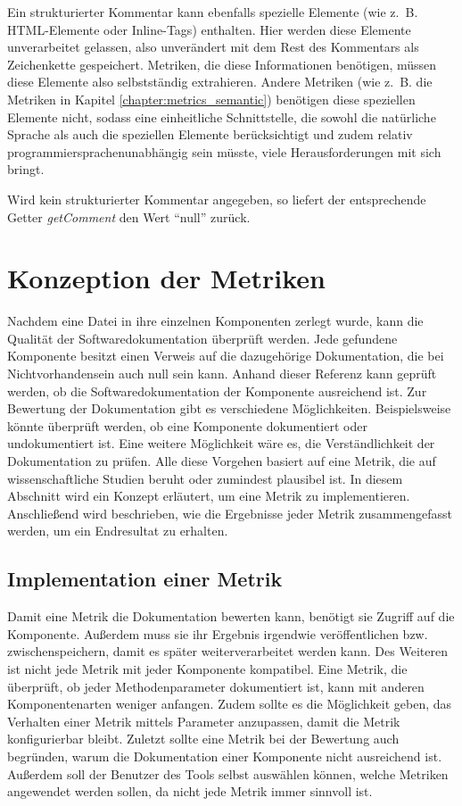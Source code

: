  Ein strukturierter Kommentar kann ebenfalls spezielle Elemente (wie z.~B. \ac{HTML}-Elemente oder Inline-Tags) enthalten. Hier werden diese Elemente unverarbeitet gelassen, also unverändert mit dem Rest des Kommentars als Zeichenkette gespeichert. Metriken, die diese Informationen benötigen, müssen diese Elemente also selbstständig extrahieren. Andere Metriken (wie z.~B. die Metriken in Kapitel \ref{chapter:metrics_semantic}) benötigen diese speziellen Elemente nicht, sodass eine einheitliche Schnittstelle, die sowohl die natürliche Sprache als auch die speziellen Elemente berücksichtigt und  zudem relativ programmiersprachenunabhängig sein müsste, viele Herausforderungen mit sich bringt.   
 
 Wird kein strukturierter Kommentar angegeben, so liefert der entsprechende Getter \textit{getComment} den Wert \enquote{null} zurück. 
\section{Konzeption der Metriken}
Nachdem eine Datei in ihre einzelnen Komponenten zerlegt wurde, kann die Qualität der Softwaredokumentation überprüft werden. Jede gefundene Komponente besitzt einen Verweis auf die dazugehörige Dokumentation, die bei Nichtvorhandensein auch null sein kann. Anhand dieser Referenz kann geprüft werden, ob die Softwaredokumentation der Komponente ausreichend ist. Zur Bewertung der Dokumentation gibt es verschiedene  Möglichkeiten. Beispielsweise könnte überprüft werden, ob eine Komponente dokumentiert oder undokumentiert ist. Eine weitere Möglichkeit wäre es, die Verständlichkeit der Dokumentation zu prüfen. Alle diese Vorgehen basiert auf eine Metrik, die auf wissenschaftliche Studien beruht oder zumindest plausibel ist. In diesem Abschnitt wird ein Konzept erläutert, um eine Metrik zu implementieren. Anschließend wird beschrieben, wie die Ergebnisse jeder Metrik zusammengefasst werden, um ein Endresultat zu erhalten. 

\subsection{Implementation einer Metrik}\label{chapter:metric_impl}
Damit eine Metrik die Dokumentation bewerten kann, benötigt sie Zugriff auf die Komponente. Außerdem muss sie ihr Ergebnis irgendwie veröffentlichen bzw. zwischenspeichern, damit es später weiterverarbeitet werden kann. Des Weiteren ist nicht jede Metrik mit jeder Komponente kompatibel. Eine Metrik, die überprüft, ob jeder Methodenparameter dokumentiert ist, kann mit anderen Komponentenarten weniger anfangen. Zudem sollte es die Möglichkeit geben, das Verhalten einer Metrik mittels Parameter anzupassen, damit die Metrik konfigurierbar bleibt. Zuletzt sollte eine Metrik bei der Bewertung auch begründen, warum die Dokumentation einer Komponente nicht ausreichend ist. Außerdem soll der Benutzer des Tools selbst auswählen können, welche Metriken angewendet werden sollen, da nicht jede Metrik immer sinnvoll ist. 

